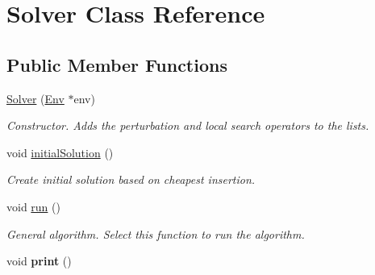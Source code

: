 \hypertarget{class_solver}{}\section{Solver Class Reference}
\label{class_solver}
\subsection*{Public Member Functions}
\begin{DoxyCompactItemize}
\item 
\hyperlink{class_solver_a05ec0ef6028f51c1eba417b41a14c2ea}{Solver} (\hyperlink{class_env}{Env} $\ast$env)
\begin{DoxyCompactList}\small\item\em Constructor. Adds the perturbation and local search operators to the lists. \end{DoxyCompactList}\item 
\mbox{\label{class_solver_a4b0fc2950022b5e5166b6d3f0564696f}} 
void \hyperlink{class_solver_a4b0fc2950022b5e5166b6d3f0564696f}{initial\+Solution} ()
\begin{DoxyCompactList}\small\item\em Create initial solution based on cheapest insertion. \end{DoxyCompactList}\item 
\mbox{\label{class_solver_a1f31e2d38dacd7e828c1bf428eb2ed96}} 
void \hyperlink{class_solver_a1f31e2d38dacd7e828c1bf428eb2ed96}{run} ()
\begin{DoxyCompactList}\small\item\em General algorithm. Select this function to run the algorithm. \end{DoxyCompactList}\item 
\mbox{\label{class_solver_a39ebda60ffaadddc1c4f85bd6cf9209c}} 
void {\bfseries print} ()
\end{DoxyCompactItemize}
